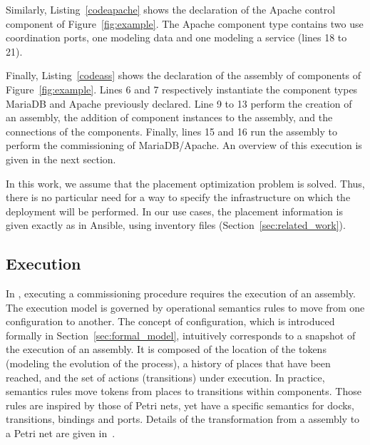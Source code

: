 

Similarly, Listing~\ref{codeapache} shows the declaration of the Apache control component of Figure~\ref{fig:example}. The Apache component type contains two use coordination ports, one modeling data and one modeling a service (lines 18 to 21).



Finally, Listing~\ref{codeass} shows the declaration of the assembly of components of Figure~\ref{fig:example}. Lines 6 and 7 respectively instantiate the component types MariaDB and Apache previously declared. Line 9 to 13 perform the creation of an assembly, the addition of component instances to the assembly, and the connections of the components. Finally, lines 15 and 16 run the assembly to perform the commissioning of MariaDB/Apache. An overview of this execution is given in the next section.



In this work, we assume that the placement optimization problem is solved. Thus, there is no particular need for a way to specify the infrastructure on which the deployment will be performed. In our use cases, the placement information is given exactly as in Ansible, \ie using inventory files (Section~\ref{sec:related_work}).

\subsection{Execution}

In \mad, executing a commissioning procedure requires the execution of an assembly. The \mad execution model is governed by operational semantics rules to move from one configuration to another. The concept of configuration, which is introduced formally in Section~\ref{sec:formal_model}, intuitively corresponds to a snapshot of the execution of an assembly. It is composed of the location of the tokens (modeling the evolution of the process), a history of places that have been reached, and the set of actions (transitions) under execution. In practice, semantics rules move tokens from places to transitions within components. Those rules are inspired by those of Petri nets, yet have a specific semantics for docks, transitions, bindings and ports. Details of the transformation from a \mad assembly to a Petri net are given in~\cite{coullon:hal-02323641}.

